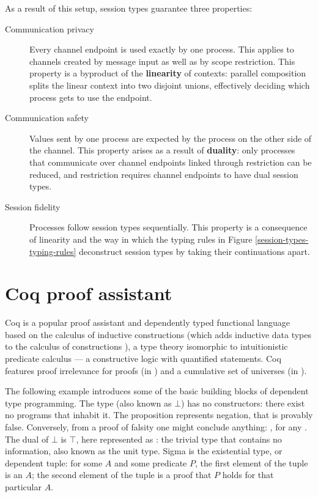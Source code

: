 \documentclass{mproj}
\begin{document}
As a result of this setup, session types guarantee three properties:
\begin{description}
    \item [Communication privacy] Every channel endpoint is used exactly by one process. This applies to channels created by message input as well as by scope restriction. This property is a byproduct of the \textbf{linearity} of contexts: parallel composition splits the linear context into two disjoint unions, effectively deciding which process gets to use the endpoint.
        
    \item [Communication safety] Values sent by one process are expected by the process on the other side of the channel. This property arises as a result of \textbf{duality}: only processes that communicate over channel endpoints linked through restriction can be reduced, and restriction requires channel endpoints to have dual session types.

    \item [Session fidelity] Processes follow session types sequentially. This property is a consequence of linearity and the way in which the typing rules in Figure \ref{session-types-typing-rules} deconstruct session types by taking their continuations apart.
\end{description}

\section{Coq proof assistant}\label{coq}

Coq \cite{CoqDeveloperCommunity} is a popular proof assistant and dependently typed functional language based on the calculus of inductive constructions \cite{Coquand1989} (which adds inductive data types to the calculus of constructions \cite{Coquand1985}), a type theory isomorphic to intuitionistic predicate calculus --- a constructive logic with quantified statements.  Coq features proof irrelevance for proofs (in ) and a cumulative set of universes (in ).

The following example introduces some of the basic building blocks of dependent type programming. The type  (also known as $\bot$) has no constructors: there exist no programs that inhabit it. The proposition  represents negation, that  is provably false. Conversely, from a proof of falsity one might conclude anything: , for any . The dual of $\bot$ is $\top$, here represented as : the trivial type that contains no information, also known as the unit type. Sigma is the existential type, or dependent tuple: for some $A$ and some predicate $P$, the first element of the tuple is an $A$; the second element of the tuple is a proof that $P$ holds for that particular $A$.
\end{document}
